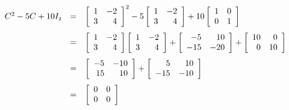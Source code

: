 \begin{ex}
\begin{enumerate}
\[ \begin{array}{rcl}

C^2 -5C + 10I_{\mbox{\tiny$2$}} & = & \left[ \begin{array}{rr} 1 & -2 \\ 3 & 4 \\ \end{array} \right]^2 - 5 \left[ \begin{array}{rr} 1 & -2 \\ 3 & 4 \\ \end{array} \right] + 10 \left[ \begin{array}{rr} 1 & 0 \\ 0 & 1 \\ \end{array} \right] \\ [13pt]

& = & \left[ \begin{array}{rr} 1 & -2 \\ 3 & 4 \\ \end{array} \right]\left[ \begin{array}{rr} 1 & -2 \\ 3 & 4 \\ \end{array} \right] + \left[ \begin{array}{rr} -5 & 10 \\ -15 & -20 \\ \end{array} \right] + \left[ \begin{array}{rr} 10 & 0 \\ 0 & 10 \\ \end{array} \right] \\ [13pt]

& = & \left[ \begin{array}{rr} -5 & -10 \\ 15 & 10 \\ \end{array} \right] + \left[ \begin{array}{rr} 5 & 10 \\ -15 & -10 \\ \end{array} \right]  \\ [13pt]

& = &  \left[ \begin{array}{rr} 0 & 0 \\ 0 & 0 \\ \end{array} \right] \\



\end{array}\]
\end{enumerate}
\end{ex}
